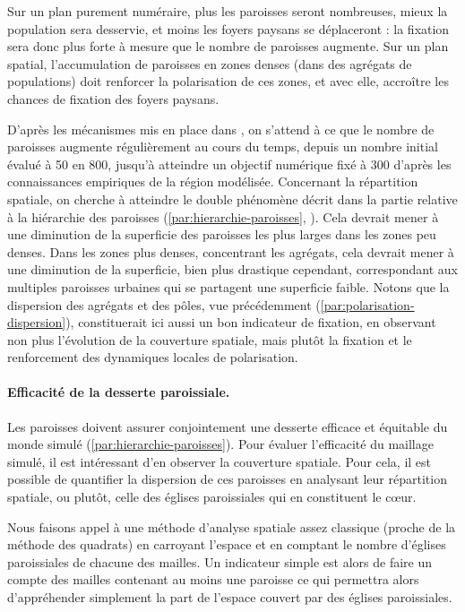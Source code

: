 Sur un plan purement numéraire, plus les paroisses seront nombreuses, mieux la population sera desservie, et moins les foyers paysans se déplaceront : la fixation sera donc plus forte à mesure que le nombre de paroisses augmente.
Sur un plan spatial, l'accumulation de paroisses en zones denses (dans des agrégats de populations) doit renforcer la polarisation de ces zones, et avec elle, accroître les chances de fixation des foyers paysans.

D'après les mécanismes mis en place dans \simfeodal{}, on s'attend à ce que le nombre de paroisses augmente régulièrement au cours du temps, depuis un nombre initial évalué à 50 en 800, jusqu'à atteindre un objectif numérique fixé à 300 d'après les connaissances empiriques de la région modélisée.
Concernant la répartition spatiale, on cherche à atteindre le double phénomène décrit dans la partie relative à la hiérarchie des paroisses (\cref{par:hierarchie-paroisses}, \pageref{par:hierarchie-paroisses}).
Cela devrait mener à une diminution de la superficie des paroisses les plus larges dans les zones peu denses.
Dans les zones plus denses, concentrant les agrégats, cela devrait mener à une diminution de la superficie, bien plus drastique cependant, correspondant aux multiples paroisses \og urbaines\fg{} qui se partagent une superficie faible.
Notons que la dispersion des agrégats et des pôles, vue précédemment (\ref{par:polarisation-dispersion}), constituerait ici aussi un bon indicateur de fixation, en observant non plus l'évolution de la couverture spatiale, mais plutôt la fixation et le renforcement des dynamiques locales de polarisation.

\paragraph{Efficacité de la desserte paroissiale.}

Les paroisses doivent assurer conjointement une desserte efficace et équitable du monde simulé (\cref{par:hierarchie-paroisses}).
Pour évaluer l'efficacité du maillage simulé, il est intéressant d'en observer la couverture spatiale.
Pour cela, il est possible de quantifier la dispersion de ces paroisses en analysant leur répartition spatiale, ou plutôt, celle des églises paroissiales qui en constituent le cœur.

Nous faisons appel à une méthode d'analyse spatiale assez classique (proche de la méthode des quadrats) en carroyant l'espace et en comptant le nombre d'églises paroissiales de chacune des mailles.
Un indicateur simple est alors de faire un compte des mailles contenant au moins une paroisse ce qui permettra alors d'appréhender simplement la part de l'espace couvert par des églises paroissiales.

